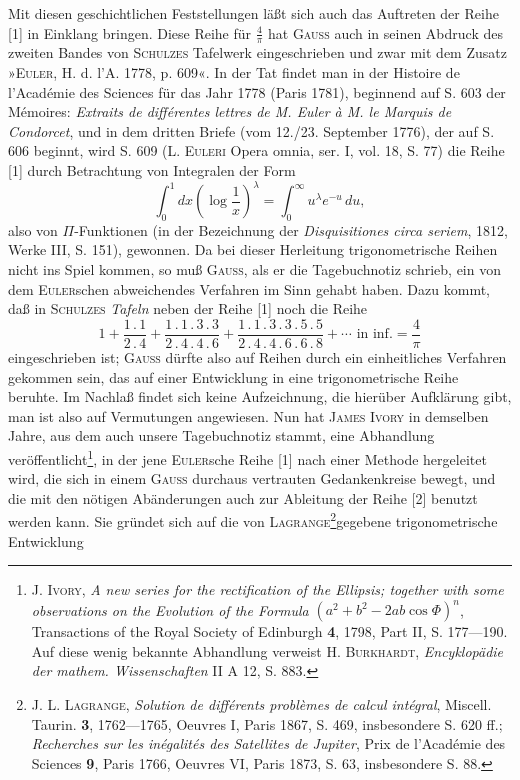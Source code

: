 Mit diesen geschichtlichen Feststellungen läßt sich auch das Auftreten der Reihe [1] in Einklang bringen. Diese Reihe für \(\frac4\pi\) hat \textsc{Gauss} auch in seinen Abdruck des zweiten Bandes von \textsc{Schulzes} Tafelwerk eingeschrieben und zwar mit dem Zusatz »\textsc{Euler}, H. d. l'A. 1778, p. 609«. In der Tat findet man in der Histoire de l'Académie des Sciences für das Jahr 1778 (Paris 1781), beginnend auf S. 603 der Mémoires: \textit{Extraits de différentes lettres de M. Euler à M. le Marquis de Condorcet}, und in dem dritten Briefe (vom 12./23. September 1776), der auf S. 606 beginnt, wird S. 609 (L. \textsc{Euleri} Opera omnia, ser. I, vol. 18, S. 77) die Reihe [1] durch Betrachtung von Integralen der Form
\[
\int_0^1 dx\left(\log\frac1x\right)^\lambda=\int_0^\infty u^\lambda e^{-u}\,du,
\]
\noindent also von \(\Pi\)-Funktionen (in der Bezeichnung der \textit{Disquisitiones circa seriem}, 1812, Werke III, S. 151), gewonnen. Da bei dieser Herleitung trigonometrische Reihen nicht ins Spiel kommen, so muß \textsc{Gauss}, als er die Tagebuchnotiz schrieb, ein von dem \textsc{Euler}schen abweichendes Verfahren im Sinn gehabt haben. Dazu kommt, daß in \textsc{Schulzes} \textit{Tafeln} neben der Reihe [1] noch die Reihe
\begin{equation}
1+\frac{1\,.\,1}{2\,.\,4}+\frac{1\,.\,1\,.\,3\,.\,3}{2\,.\,4\,.\,4\,.\,6}+\frac{1\,.\,1\,.\,3\,.\,3\,.\,5\,.\,5}{2\,.\,4\,.\,4\,.\,6\,.\,6\,.\,8}+\cdots\text{ in inf.}=\frac4\pi\tag*{[2]}
\end{equation}
\noindent eingeschrieben ist; \textsc{Gauss} dürfte also auf  Reihen durch ein einheitliches Verfahren gekommen sein, das auf einer Entwicklung in eine trigonometrische Reihe beruhte. Im Nachlaß findet sich keine Aufzeichnung, die hierüber Aufklärung gibt, man ist also auf Vermutungen angewiesen. Nun hat \textsc{James Ivory} in demselben Jahre, aus dem auch unsere Tagebuchnotiz stammt, eine Abhandlung veröffentlicht\footnote{J. \textsc{Ivory}, \textit{A new series for the rectification of the Ellipsis; together with some observations on the Evolution of the Formula} \((a^2+b^2-2ab\cos\Phi)^n\), Transactions of the Royal Society of Edinburgh \textbf{4}, 1798, Part II, S. 177—190. Auf diese wenig bekannte Abhandlung verweist H. \textsc{Burkhardt}, \textit{Encyklopädie der mathem. Wissenschaften} II A 12, S. 883.}, in der jene \textsc{Euler}sche Reihe [1] nach einer Methode hergeleitet wird, die sich in einem \textsc{Gauss} durchaus vertrauten Gedankenkreise bewegt, und die mit den nötigen Abänderungen auch zur Ableitung der Reihe [2] benutzt werden kann. Sie gründet sich auf die von \textsc{Lagrange}\begingroup\renewcommand{\thefootnote}{**)}\footnote{J. L. \textsc{Lagrange}, \textit{Solution de différents problèmes de calcul intégral}, Miscell. Taurin. \textbf{3}, 1762—1765, Oeuvres I, Paris 1867, S. 469, insbesondere S. 620 ff.; \textit{Recherches sur les inégalités des Satellites de Jupiter}, Prix de l'Académie des Sciences \textbf{9}, Paris 1766, Oeuvres VI, Paris 1873, S. 63, insbesondere S. 88.}\endgroup gegebene trigonometrische Entwicklung
